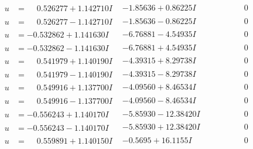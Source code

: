\documentclass[1p]{elsarticle_modified}
\theoremstyle{definition}
\begin{document}
$$\begin{array}{c|c|c}
\begin{aligned}
u &= \phantom{-}0.526277 + 1.142710 I\end{aligned}
 & -1.85636 + 0.86225 I & \phantom{-0.000000 } 0 \\ \hline\begin{aligned}
u &= \phantom{-}0.526277 - 1.142710 I\end{aligned}
 & -1.85636 - 0.86225 I & \phantom{-0.000000 } 0 \\ \hline\begin{aligned}
u &= -0.532862 + 1.141630 I\end{aligned}
 & -6.76881 - 4.54935 I & \phantom{-0.000000 } 0 \\ \hline\begin{aligned}
u &= -0.532862 - 1.141630 I\end{aligned}
 & -6.76881 + 4.54935 I & \phantom{-0.000000 } 0 \\ \hline\begin{aligned}
u &= \phantom{-}0.541979 + 1.140190 I\end{aligned}
 & -4.39315 + 8.29738 I & \phantom{-0.000000 } 0 \\ \hline\begin{aligned}
u &= \phantom{-}0.541979 - 1.140190 I\end{aligned}
 & -4.39315 - 8.29738 I & \phantom{-0.000000 } 0 \\ \hline\begin{aligned}
u &= \phantom{-}0.549916 + 1.137700 I\end{aligned}
 & -4.09560 + 8.46534 I & \phantom{-0.000000 } 0 \\ \hline\begin{aligned}
u &= \phantom{-}0.549916 - 1.137700 I\end{aligned}
 & -4.09560 - 8.46534 I & \phantom{-0.000000 } 0 \\ \hline\begin{aligned}
u &= -0.556243 + 1.140170 I\end{aligned}
 & -5.85930 - 12.38420 I & \phantom{-0.000000 } 0 \\ \hline\begin{aligned}
u &= -0.556243 - 1.140170 I\end{aligned}
 & -5.85930 + 12.38420 I & \phantom{-0.000000 } 0 \\ \hline\begin{aligned}
u &= \phantom{-}0.559891 + 1.140150 I\end{aligned}
 & -0.5695 + 16.1155 I & \phantom{-0.000000 } 0 \\ \hline\begin{aligned}

\end{aligned}
\end{array}$$
\end{document}
